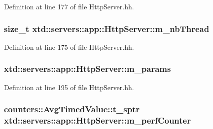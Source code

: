 Definition at line 177 of file Http\-Server.\-hh.

\hypertarget{classxtd_1_1servers_1_1app_1_1HttpServer_a2f0812d24ccfd55e943f3144c672b473}{
\subsubsection[{m\-\_\-nb\-Thread}]{\setlength{\rightskip}{0pt plus 5cm}size\-\_\-t xtd\-::servers\-::app\-::\-Http\-Server\-::m\-\_\-nb\-Thread\hspace{0.3cm}{\ttfamily [protected]}}}\label{classxtd_1_1servers_1_1app_1_1HttpServer_a2f0812d24ccfd55e943f3144c672b473}


Definition at line 175 of file Http\-Server.\-hh.

\hypertarget{classxtd_1_1servers_1_1app_1_1HttpServer_ac4f9a2c40867f4f2ba8d30ec9876e51e}{
\subsubsection[{m\-\_\-params}]{ xtd\-::servers\-::app\-::\-Http\-Server\-::m\-\_\-params\hspace{0.3cm}{\ttfamily [protected]}}}\label{classxtd_1_1servers_1_1app_1_1HttpServer_ac4f9a2c40867f4f2ba8d30ec9876e51e}


Definition at line 195 of file Http\-Server.\-hh.

\hypertarget{classxtd_1_1servers_1_1app_1_1HttpServer_afc57d4c9bc2f9a47440e3c54eb92b1fb}{
\subsubsection[{m\-\_\-perf\-Counter}]{\setlength{\rightskip}{0pt plus 5cm}counters\-::\-Avg\-Timed\-Value\-::t\-\_\-sptr xtd\-::servers\-::app\-::\-Http\-Server\-::m\-\_\-perf\-Counter\hspace{0.3cm}{\ttfamily [protected]}}}\label{classxtd_1_1servers_1_1app_1_1HttpServer_afc57d4c9bc2f9a47440e3c54eb92b1fb}


